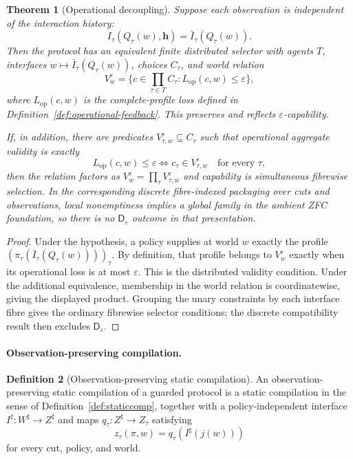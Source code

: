 \documentclass[11pt]{article}
\theoremstyle{plain}
\newtheorem{theorem}{Theorem}[section]
\theoremstyle{definition}
\newtheorem{definition}[theorem]{Definition}
\theoremstyle{remark}
\newcommand{\eps}{\varepsilon}
\begin{document}
\begin{theorem}[Operational decoupling]
\label{thm:operational-decoupling}
Suppose each observation is independent of the interaction history:
\[
I_\tau(Q_\tau(w),\mathbf h)=\bar I_\tau(Q_\tau(w)).
\]
Then the protocol has an equivalent finite distributed selector with agents
$T$, interfaces $w\mapsto\bar I_\tau(Q_\tau(w))$, choices $C_\tau$, and
world relation
\[
V_w^\eps=
\{c\in\prod_{\tau\in T}C_\tau:
L_{\mathrm{op}}(c,w)\le\eps\},
\]
where $L_{\mathrm{op}}(c,w)$ is the complete-profile loss defined in
Definition~\ref{def:operational-feedback}. This preserves and reflects
$\eps$-capability.

If, in addition, there are predicates
$V_{\tau,w}^\eps\subseteq C_\tau$ such that operational aggregate validity is
exactly
\[
L_{\mathrm{op}}(c,w)\le\eps
\iff
c_\tau\in V_{\tau,w}^\eps\quad\text{for every }\tau,
\]
then the relation factors as $V_w^\eps=\prod_\tau V_{\tau,w}^\eps$ and
capability is simultaneous fibrewise selection. In the corresponding discrete fibre-indexed packaging over cuts and
observations, local nonemptiness implies a global family in the ambient ZFC
foundation, so there is no $\mathsf D_\eps$ outcome in that presentation.
\end{theorem}

\begin{proof}
Under the hypothesis, a policy supplies at world $w$ exactly the profile
$(\pi_\tau(\bar I_\tau(Q_\tau(w))))_\tau$. By definition, that profile belongs
to $V_w^\eps$ exactly when its operational loss is at most $\eps$. This is the
distributed validity condition. Under the additional equivalence, membership in
the world relation is coordinatewise, giving the displayed product. Grouping
the unary constraints by each interface fibre gives the ordinary fibrewise
selector conditions; the discrete compatibility result then excludes
$\mathsf D_\eps$.
\end{proof}

\paragraph{Observation-preserving compilation.}

\begin{definition}[Observation-preserving static compilation]
\label{def:observation-compilation}
An observation-preserving static compilation of a guarded protocol is a static
compilation in the sense of Definition~\ref{def:staticcomp}, together with a
policy-independent interface $I^\sharp:W^\sharp\to Z^\sharp$ and maps
$q_\tau:Z^\sharp\to Z_\tau$ satisfying
\[
z_\tau(\pi,w)=q_\tau(I^\sharp(j(w)))
\]
for every cut, policy, and world.
\end{definition}
\end{document}
